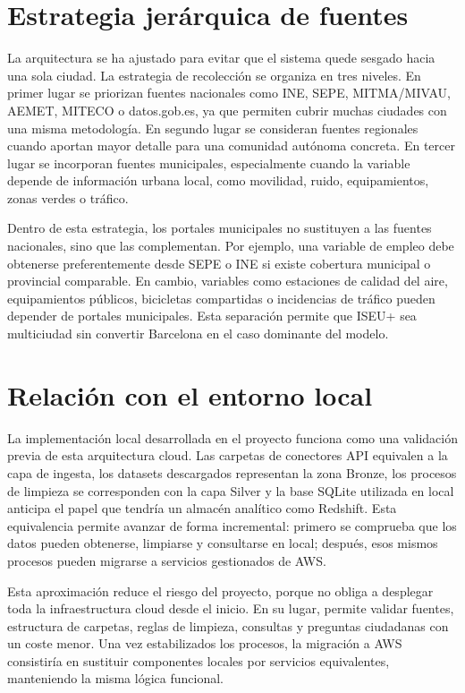 \section{Estrategia jerárquica de fuentes}

La arquitectura se ha ajustado para evitar que el sistema quede sesgado hacia una sola ciudad. La estrategia de recolección se organiza en tres niveles. En primer lugar se priorizan fuentes nacionales como INE, SEPE, MITMA/MIVAU, AEMET, MITECO o datos.gob.es, ya que permiten cubrir muchas ciudades con una misma metodología. En segundo lugar se consideran fuentes regionales cuando aportan mayor detalle para una comunidad autónoma concreta. En tercer lugar se incorporan fuentes municipales, especialmente cuando la variable depende de información urbana local, como movilidad, ruido, equipamientos, zonas verdes o tráfico.

Dentro de esta estrategia, los portales municipales no sustituyen a las fuentes nacionales, sino que las complementan. Por ejemplo, una variable de empleo debe obtenerse preferentemente desde SEPE o INE si existe cobertura municipal o provincial comparable. En cambio, variables como estaciones de calidad del aire, equipamientos públicos, bicicletas compartidas o incidencias de tráfico pueden depender de portales municipales. Esta separación permite que ISEU+ sea multiciudad sin convertir Barcelona en el caso dominante del modelo.

\section{Relación con el entorno local}

La implementación local desarrollada en el proyecto funciona como una validación previa de esta arquitectura cloud. Las carpetas de conectores API equivalen a la capa de ingesta, los datasets descargados representan la zona Bronze, los procesos de limpieza se corresponden con la capa Silver y la base SQLite utilizada en local anticipa el papel que tendría un almacén analítico como Redshift. Esta equivalencia permite avanzar de forma incremental: primero se comprueba que los datos pueden obtenerse, limpiarse y consultarse en local; después, esos mismos procesos pueden migrarse a servicios gestionados de AWS.

Esta aproximación reduce el riesgo del proyecto, porque no obliga a desplegar toda la infraestructura cloud desde el inicio. En su lugar, permite validar fuentes, estructura de carpetas, reglas de limpieza, consultas y preguntas ciudadanas con un coste menor. Una vez estabilizados los procesos, la migración a AWS consistiría en sustituir componentes locales por servicios equivalentes, manteniendo la misma lógica funcional.

